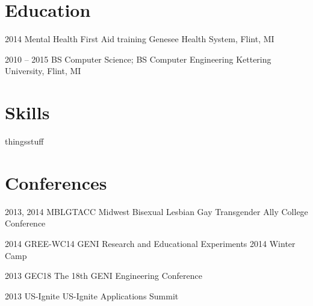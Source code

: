 \documentclass[12pt]{actccv/actccv}
\begin{document}
\eject
\section{Education}

\begin{yearlist}

\item{2014}
     {Mental Health First Aid training}
     {Genesee Health System, Flint, MI}

\item{2010 -- 2015}
     {BS Computer Science; BS Computer Engineering}
     {Kettering University, Flint, MI}

\end{yearlist}

\section{Skills}

\begin{factlist}
\item{things}{stuff}
\end{factlist}

\section{Conferences}

\begin{yearlist}
\item{2013, 2014}
     {MBLGTACC}
     {Midwest Bisexual Lesbian Gay Transgender Ally College Conference}
\item{2014}
     {GREE-WC14}
     {GENI Research and Educational Experiments 2014 Winter Camp}
\item{2013}
     {GEC18}
     {The 18th GENI Engineering Conference}
\item{2013}
     {US-Ignite}
     {US-Ignite Applications Summit}
\end{yearlist}
\end{document}
